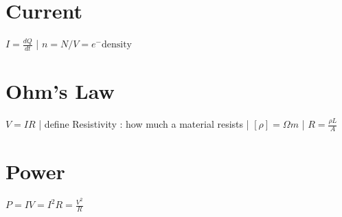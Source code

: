 \section*{Current}
$I = \frac{dQ}{dt}$ | $n = N/V = e^- \text{density}$

\section*{Ohm's Law}
$V = IR$ | define Resistivity : how much a material resists | $[\rho] = \Omega m$ | $R = \frac{\rho L}{A}$

\section*{Power}

$P = IV = I^2R = \frac{V^2}{R}$